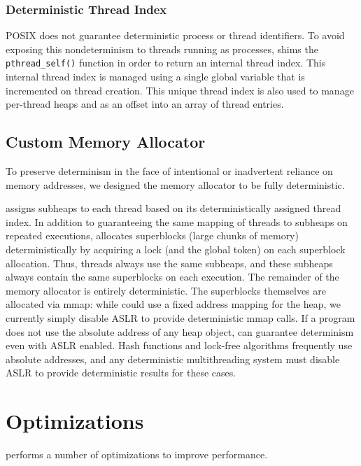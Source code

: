 \subsubsection{Deterministic Thread Index}
\label{sec:threadindex}

POSIX does not guarantee deterministic process or thread identifiers. To avoid exposing this nondeterminism to threads running as processes, \dthreads{} shims the \texttt{pthread\_self()} function in order to return an internal thread index.  This internal thread index is managed using a single global variable that is incremented on thread creation.  This unique thread index is also used to manage per-thread heaps and as an offset into an array of thread entries.

\subsection{Custom Memory Allocator}

To preserve determinism in the face of intentional or inadvertent reliance on memory addresses, we designed the \dthreads{} memory allocator to be fully deterministic. 

\dthreads{} assigns subheaps to each thread based on its deterministically assigned thread index. In addition to guaranteeing the same mapping of threads to subheaps on repeated executions, \dthreads{} allocates superblocks (large chunks of memory) deterministically by acquiring a lock (and the global token) on each
superblock allocation. Thus, threads always use the same subheaps, and these subheaps always contain the same superblocks on each execution. The remainder of the memory allocator is entirely deterministic. The superblocks themselves are allocated via mmap: while \dthreads{} could use a fixed address mapping for the heap, we currently simply disable ASLR to provide deterministic mmap calls. If a program does not use the absolute address of any heap object, \dthreads{} can guarantee determinism even with ASLR enabled.
Hash functions and lock-free algorithms frequently use absolute addresses, and any deterministic multithreading system must disable ASLR to provide deterministic results for these cases.


\section{Optimizations}
\label{sec:dthreads-optimization}

\dthreads{} performs a number of optimizations to improve performance.

